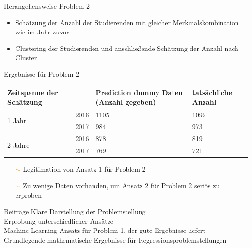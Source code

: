 \documentclass[17pt, fleqn]{beamer}
\begin{document}
\begin{frame}{Herangehensweise Problem 2}
    \begin{itemize}
        \item Schätzung der Anzahl der Studierenden mit gleicher Merkmalskombination wie im Jahr zuvor \\[1cm]
        \pause
        \item Clustering der Studierenden und anschließende Schätzung der Anzahl nach Cluster
    \end{itemize}
    
\end{frame}

\begin{frame}{Ergebnisse für Problem 2}
    \scriptsize{
    \begin{table}[ht]
        \begin{tabular}{ p{1cm} p{1cm} p{2.5cm} p{2cm} }
          Zeitspanne der Sch\"atzung &   & Prediction dummy Daten (Anzahl gegeben) & tats\"achliche Anzahl \\
          \hline
          \multirow{2}{3em}{1 Jahr}
                                     & 2016                   & 1105                                    & 1092                  \\
                                     & 2017                   & 984                                     & 973                   \\
          \hline
          \multirow{2}{4em}{2 Jahre}
                                     & 2016                   & 878                                     & 819                   \\
                                     & 2017                   & 769                                     & 721                   \\
          \hline
        \end{tabular}
      \end{table}
    } \pause
    \small{
    \begin{itemize}
        \item[\textcolor{orange}{$\sim$}] Legitimation von Ansatz 1 für Problem 2 \pause
        \item[\textcolor{orange}{$\sim$}] Zu wenige Daten vorhanden, um Ansatz 2 für Problem 2 seriös zu erproben
    \end{itemize}
    }
\end{frame}

\begin{frame}{Beiträge}
    \pause
    Klare Darstellung der Problemstellung \\[1cm]
    \pause
    Erprobung unterschiedlicher Ansätze \\[1cm]
    \pause
    Machine Learning Ansatz für Problem 1, der gute Ergebnisse liefert \\[1cm]
    \pause
    Grundlegende mathematische Ergebnisse für Regressionsproblemstellungen
    
\end{frame}
\end{document}
